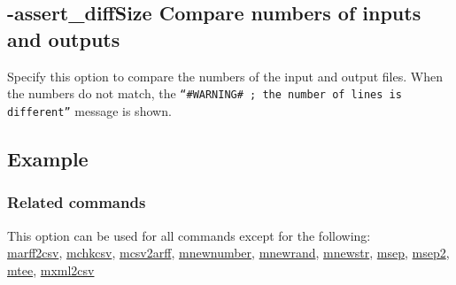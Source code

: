 

%

\subsection{-assert\_diffSize Compare numbers of inputs and outputs\label{sect:option_assert_diffSize}}

Specify this option to compare the numbers of the input and output files. 
When the numbers do not match, the \verb|“#WARNING# ; the number of lines is different”| message is shown.

\subsection*{Example}


\subsubsection*{Related commands}
This option can be used for all commands except for the following: \\
\hyperref[sect:marff2csv]{marff2csv},
\hyperref[sect:mchkcsv]{mchkcsv},
\hyperref[sect:mcsv2arff]{mcsv2arff},
\hyperref[sect:mnewnumber]{mnewnumber},
\hyperref[sect:mnewrand]{mnewrand},
\hyperref[sect:mnewstr]{mnewstr},
\hyperref[sect:msep]{msep},
\hyperref[sect:msep2]{msep2},
\hyperref[sect:mtee]{mtee},
\hyperref[sect:mxml2csv]{mxml2csv}\\

%
